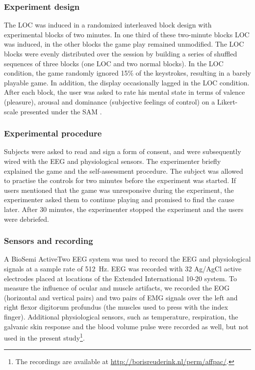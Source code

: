\subsubsection{Experiment design}
The \ac{LOC} was induced in a randomized interleaved block design with
experimental blocks of two minutes. In one third of these two-minute blocks
\ac{LOC} was induced, in the other blocks the game play remained unmodified.
The \ac{LOC} blocks were evenly distributed over the session by building a
series of shuffled sequences of three blocks (one \ac{LOC} and two normal
blocks). In the \ac{LOC} condition, the game randomly ignored 15\% of the keystrokes, resulting in a barely playable game. In addition, the display
occasionally lagged in the \ac{LOC} condition. After each block, the user was
asked to rate his mental state in terms of valence (pleasure), arousal and
dominance (subjective feelings of control) on a Likert-scale presented under
the \ac{SAM} \cite{bradly1994mes}.

\subsubsection{Experimental procedure}
Subjects were asked to read and sign a form of consent, and were subsequently
wired with the \ac{EEG} and physiological sensors. The experimenter briefly
explained the game and the self-assessment procedure. The subject was
allowed to practise the controls for two minutes before the experiment was
started. If users mentioned that the game was unresponsive during the
experiment, the experimenter asked them to continue playing and promised to
find the cause later. After 30 minutes, the experimenter stopped the experiment
and the users were debriefed.

\subsubsection{Sensors and recording}
\begin{sloppypar}
A BioSemi ActiveTwo \ac{EEG} system was used to record the \ac{EEG} and
physiological signals at a sample rate of 512~Hz. \Ac{EEG} was recorded with 32
Ag/AgCl active electrodes placed at locations of the Extended International
10-20 system. To measure the influence of ocular and muscle artifacts, we
recorded the \acs{EOG} (horizontal and vertical pairs) and two pairs of
\acs{EMG} signals over the left and right flexor digitorum profundus (the
muscles used to press with the index finger).  Additional physiological
sensors, such as temperature, respiration, the galvanic skin response and the
blood volume pulse were recorded as well, but not used in the present
study\footnote{The recordings are available at
\url{http://borisreuderink.nl/perm/affpac/}.}.
\end{sloppypar}

